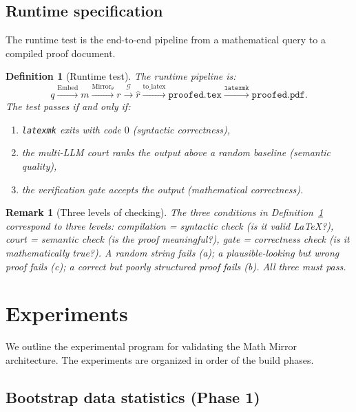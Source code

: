 \documentclass[11pt,a4paper]{article}
\newtheorem{definition}[theorem]{Definition}
\newtheorem{remark}[theorem]{Remark}
\newcommand{\cG}{\mathcal{G}}
\newcommand{\Embed}{\mathrm{Embed}}
\newcommand{\Mirror}{\mathrm{Mirror}}
\begin{document}
\subsection{Runtime specification}\label{sec:runtime}

The runtime test is the end-to-end pipeline from a mathematical
query to a compiled proof document.

\begin{definition}[Runtime test]\label{def:runtime}
The runtime pipeline is:
\[
q \xrightarrow{\Embed} m \xrightarrow{\Mirror_\theta} r
  \xrightarrow{\cG} \hat{r}
  \xrightarrow{\text{to\_latex}} \texttt{proofed.tex}
  \xrightarrow{\texttt{latexmk}} \texttt{proofed.pdf}.
\]
The test passes if and only if:
\begin{enumerate}[label=(\alph*),nosep]
\item \texttt{latexmk} exits with code $0$ (syntactic correctness),
\item the multi-LLM court ranks the output above a random
  baseline (semantic quality),
\item the verification gate accepts the output
  (mathematical correctness).
\end{enumerate}
\end{definition}

\begin{remark}[Three levels of checking]\label{rem:three-checks}
The three conditions in Definition~\ref{def:runtime}
correspond to three levels:
\emph{compilation} = syntactic check (is it valid LaTeX?),
\emph{court} = semantic check (is the proof meaningful?),
\emph{gate} = correctness check (is it mathematically true?).
A random string fails (a); a plausible-looking but wrong proof
fails (c); a correct but poorly structured proof fails (b).
All three must pass.
\end{remark}

\section{Experiments}\label{sec:experiments}

We outline the experimental program for validating the
Math Mirror architecture.
The experiments are organized in order of the build phases.

\subsection{Bootstrap data statistics (Phase 1)}
\end{document}
